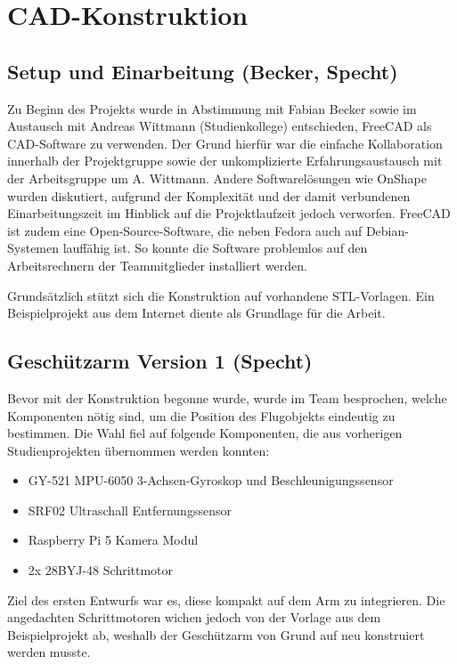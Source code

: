 \chapter{CAD-Konstruktion}

\section{Setup und Einarbeitung (Becker, Specht)}

Zu Beginn des Projekts wurde in Abstimmung mit Fabian Becker sowie im Austausch mit Andreas Wittmann (Studienkollege) entschieden, FreeCAD als CAD-Software zu verwenden. Der Grund hierfür war die einfache Kollaboration innerhalb der Projektgruppe sowie der unkomplizierte Erfahrungsaustausch mit der Arbeitsgruppe um A. Wittmann. Andere Softwarelösungen wie OnShape wurden diskutiert, aufgrund der Komplexität und der damit verbundenen Einarbeitungszeit im Hinblick auf die Projektlaufzeit jedoch verworfen. FreeCAD ist zudem eine Open-Source-Software, die neben Fedora auch auf Debian-Systemen lauffähig ist. So konnte die Software problemlos auf den Arbeitsrechnern der Teammitglieder installiert werden.

Grundsätzlich stützt sich die Konstruktion auf vorhandene STL-Vorlagen. Ein Beispielprojekt aus dem Internet diente als Grundlage für die Arbeit.

\section{Geschützarm Version 1 (Specht)}

Bevor mit der Konstruktion begonne wurde, wurde im Team besprochen, welche Komponenten nötig sind, um die Position des Flugobjekts eindeutig zu bestimmen. Die Wahl fiel auf folgende Komponenten, die aus vorherigen Studienprojekten übernommen werden konnten:

\begin{itemize}
    \item GY-521 MPU-6050 3-Achsen-Gyroskop und Beschleunigungssensor
    \item SRF02 Ultraschall Entfernungssensor
    \item Raspberry Pi 5 Kamera Modul
    \item 2x 28BYJ-48 Schrittmotor
\end{itemize}

Ziel des ersten Entwurfs war es, diese kompakt auf dem Arm zu integrieren. Die angedachten Schrittmotoren wichen jedoch von der Vorlage aus dem Beispielprojekt ab, weshalb der Geschützarm von Grund auf neu konstruiert werden musste.

